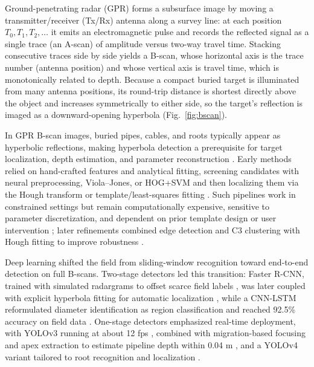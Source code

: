 \documentclass[lettersize,journal]{IEEEtran}
\begin{document}
Ground-penetrating radar (GPR) forms a subsurface image by moving a transmitter/receiver (Tx/Rx) antenna along a survey line: at each position $T_0,T_1,T_2,\dots$ it emits an electromagnetic pulse and records the reflected signal as a single trace (an A-scan) of amplitude versus two-way travel time. Stacking consecutive traces side by side yields a B-scan, whose horizontal axis is the trace number (antenna position) and whose vertical axis is travel time, which is monotonically related to depth. Because a compact buried target is illuminated from many antenna positions, its round-trip distance is shortest directly above the object and increases symmetrically to either side, so the target's reflection is imaged as a downward-opening hyperbola (Fig.~\ref{fig:bscan}).

In GPR B-scan images, buried pipes, cables, and roots typically appear as hyperbolic reflections, making hyperbola detection a prerequisite for target localization, depth estimation, and parameter reconstruction \cite{jin2024gprformer,lei2020cnnlstm,maas2013violahough}. Early methods relied on hand-crafted features and analytical fitting, screening candidates with neural preprocessing, Viola--Jones, or HOG+SVM and then localizing them via the Hough transform or template/least-squares fitting \cite{alnuaimy2000nn,maas2013violahough,lee2014hog,sagnard2016template,dou2017c3}. Such pipelines work in constrained settings but remain computationally expensive, sensitive to parameter discretization, and dependent on prior template design or user intervention \cite{lei2020cnnlstm,pham2018fasterrcnn,sagnard2016template,kafedziski2018c3hough}; later refinements combined edge detection and C3 clustering with Hough fitting to improve robustness \cite{kafedziski2018c3hough,barkataki2023c3}.

Deep learning shifted the field from sliding-window recognition toward end-to-end detection on full B-scans. Two-stage detectors led this transition: Faster R-CNN, trained with simulated radargrams to offset scarce field labels \cite{pham2018fasterrcnn}, was later coupled with explicit hyperbola fitting for automatic localization \cite{lei2019autohyperbola}, while a CNN-LSTM reformulated diameter identification as region classification and reached 92.5\% accuracy on field data \cite{lei2020cnnlstm}. One-stage detectors emphasized real-time deployment, with YOLOv3 running at about 12 fps \cite{li2020yolov3}, combined with migration-based focusing and apex extraction to estimate pipeline depth within 0.04 m \cite{liu2022pipeline}, and a YOLOv4 variant tailored to root recognition and localization \cite{li2022yolov4root}.
\end{document}
